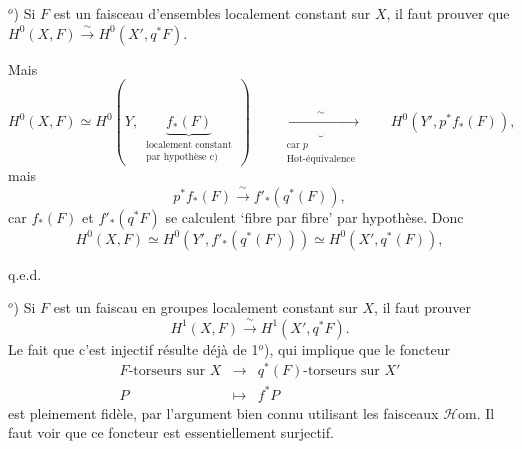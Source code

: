 
$^o$) Si $F$ est un faisceau d'ensembles localement constant sur $X$, il faut prouver que $H^0(X,F) \xrightarrow{\sim} H^0(X', q^*F)$.


\noindent Mais
\[
H^0(X,F) \simeq H^0(Y,\ \underbrace{f_*(F)}_{\substack{\text{localement constant}\\ \text{par hypothèse c)}}}\ )
\qquad
\underbrace{\xrightarrow{\qquad\sim\qquad}}_{\substack{\text{car } p\\ \text{Hot-équivalence}}}
\qquad
H^0(Y', p^* f_*(F)),
\]
mais
\[
p^* f_*(F) \xrightarrow{\ \sim\ } f'_*(q^*(F)),
\]
car $f_*(F)$ et $f'_*(q^*F)$ se calculent `fibre par fibre' par hypothèse. Donc
\[
H^0(X,F) \simeq H^0(Y', f'_*(q^*(F))) \simeq H^0(X', q^*(F)),
\]

\hfill q.e.d.

$^o$) Si $F$ est un faiscau en groupes localement constant sur $X$, il faut prouver %
\[
H^1(X,F) \xrightarrow{\ \sim\ } H^1(X', q^*F).
\]
Le fait que c'est injectif résulte déjà de 1$^o$), qui implique que le foncteur
\[
\begin{array}{rcl}
F\text{-torseurs sur } X & \longrightarrow & q^*(F)\text{-torseurs sur } X' \\
P & \longmapsto & f^*P %
\end{array}
\]
est pleinement fidèle, par l'argument bien connu utilisant les faisceaux $\mathcal{H}$om. Il faut voir que ce foncteur est essentiellement surjectif.


